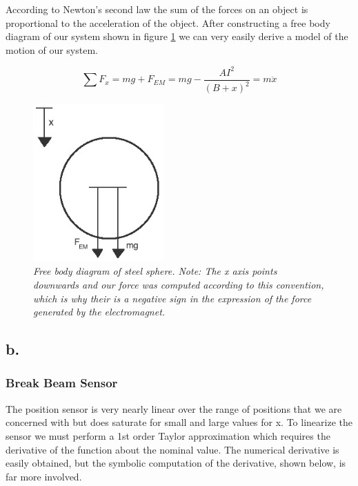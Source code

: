 \documentclass{article}
\theoremstyle{plain}
\theoremstyle{definition}
\theoremstyle{remark}
\begin{document}
According to Newton's second law the sum of the forces on an object is proportional to the acceleration of the object.  After constructing a free body diagram of our system shown in figure \ref{Q1_a4} we can very easily derive a model of the motion of our system.

$$ \sum F_x = mg + F_{EM} = mg -\frac{A I^2}{(B+x)^2} = m  \ddot{x}$$

\begin{figure}
\begin{center}
\includegraphics[width = 5cm]{freebodydiagram.png}
\caption{\emph{Free body diagram of steel sphere.  Note: The x axis points downwards and our force was computed according to this convention, which is why their is a negative sign in the expression of the force generated by the electromagnet.}}
\label{Q1_a4}
\end{center}
\end{figure}

\subsection*{b.}
\subsubsection*{Break Beam Sensor}
The position sensor is very nearly linear over the range of positions that we are concerned with but does saturate for small and large values for x.  To linearize the sensor we must perform a 1st order Taylor approximation which requires the derivative of the function about the nominal value.  The numerical derivative is easily obtained, but the symbolic computation of the derivative, shown below, is far more involved. 
\end{document}
